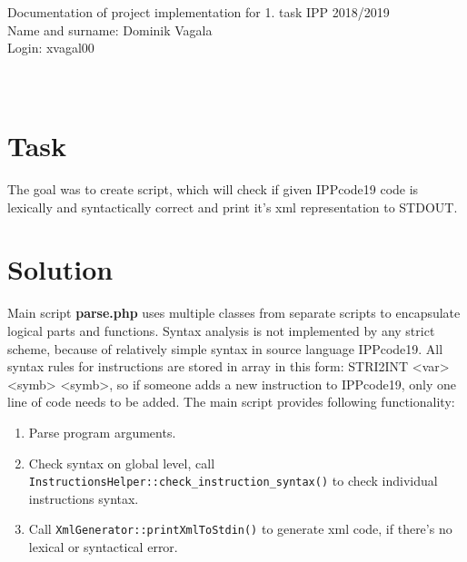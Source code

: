 \documentclass[10pt, a4paper]{article}
\begin{document}

\noindent Documentation of project implementation for 1. task IPP 2018/2019\\
Name and surname: Dominik Vagala\\
Login: xvagal00\\\\\\
 
\section*{Task}
The goal was to create script, which will check if given IPPcode19 code is lexically and syntactically correct and print it's xml representation to STDOUT.
 
\section*{Solution}

Main script \textbf{parse.php} uses multiple classes from separate scripts to encapsulate logical parts and functions. Syntax analysis is not implemented by any strict scheme, because of relatively simple syntax in source language IPPcode19. All syntax rules for instructions are stored in array in this form: STRI2INT <var> <symb> <symb>, so if someone adds a new instruction to IPPcode19, only one line of code needs to be added. The main script provides following functionality:
\begin{enumerate}[itemsep=0mm]
	\item Parse program arguments.
	\item Check syntax on global level, call \texttt{InstructionsHelper::check\_instruction\_syntax()} to check individual instructions syntax.
	\item Call \texttt{XmlGenerator::printXmlToStdin()} to generate xml code, if there's no lexical or syntactical error.
\end{enumerate}
\end{document}
